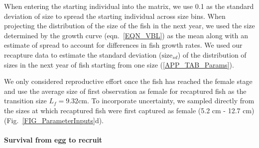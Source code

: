 \documentclass[12pt, oneside]{article}   	%
\begin{document}
When entering the starting individual into the matrix, we use 0.1 as the standard deviation of size to spread the starting individual across size bins. When projecting the distribution of the size of the fish in the next year, we used the size determined by the growth curve (eqn.\ \ref{EQN_VBL}) as the mean along with an estimate of spread to account for differences in fish growth rates. We used our recapture data to estimate the standard deviation ($\text{size}_{sd}$) of the distribution of sizes in the next year of fish starting from one size (\ref{APP_TAB_Params}). %

We only considered reproductive effort once the fish has reached the female stage and use the average size of first observation as female for recaptured fish as the transition size $L_f = 9.32 \text{cm}$. To incorporate uncertainty, we sampled directly from the sizes at which recaptured fish were first captured as female (5.2 cm - 12.7 cm) (Fig.\ \ref{FIG_ParameterInputs}d).



\paragraph*{Survival from egg to recruit}
\end{document}
